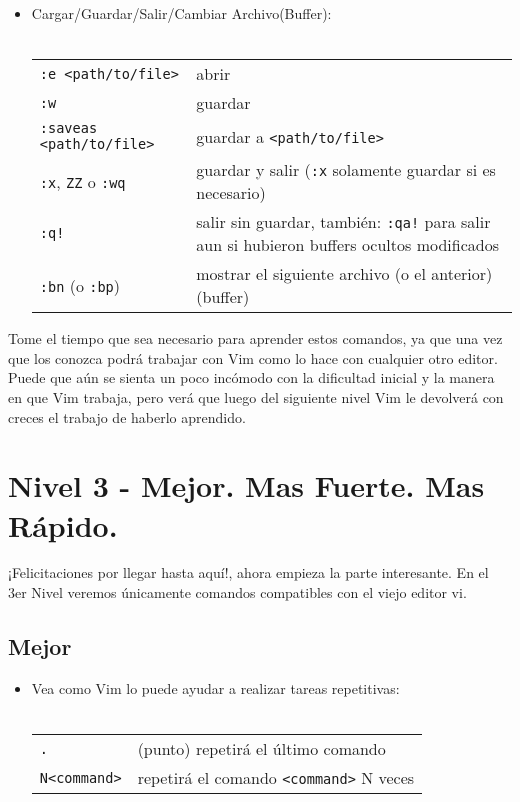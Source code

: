\documentclass[12pt]{article}
\begin{document}
\begin{itemize}
	\item Cargar/Guardar/Salir/Cambiar Archivo(Buffer): \\ \\
\begin{tabular}{ l l }
            \texttt{:e <path/to/file>} & abrir \\
            \texttt{:w} & guardar \\
            \texttt{:saveas <path/to/file>} & guardar a \texttt{<path/to/file>} \\
            \texttt{:x}, \texttt{ZZ} o \texttt{:wq} & guardar y salir (\texttt{:x} solamente guardar si es necesario) \\
            \texttt{:q!} & salir sin guardar, también: \texttt{:qa!} para salir aun si hubieron buffers ocultos modificados \\
            \texttt{:bn} (o \texttt{:bp}) & mostrar el siguiente archivo (o el anterior) (buffer) \\
\end{tabular}
\end{itemize}



Tome el tiempo que sea necesario para aprender estos comandos,
ya que una vez que los conozca podrá trabajar con Vim como lo
hace con cualquier otro editor. Puede que aún se sienta un poco incómodo 
con la dificultad inicial y la manera en que Vim trabaja, pero verá
que luego del siguiente nivel Vim le devolverá con creces el trabajo
de haberlo aprendido.


\section{Nivel 3 - Mejor. Mas Fuerte. Mas Rápido.}


¡Felicitaciones por llegar hasta aquí!, ahora empieza la parte interesante.
En el 3er Nivel veremos únicamente comandos compatibles con el viejo editor vi.


\subsection{Mejor}


\begin{itemize}
	\item Vea como Vim lo puede ayudar a realizar tareas repetitivas: \\ \\
\begin{tabular}{ l l }
	\texttt{.} & (punto) repetirá el último comando \\
	\texttt{N<command>} & repetirá el comando \texttt{<command>} N veces \\
\end{tabular}
\end{itemize}
\end{document}
